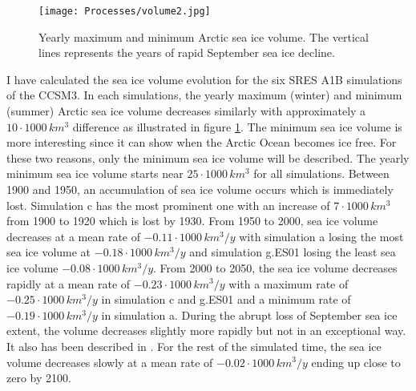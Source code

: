 \begin{figure}[t!]
\center
\noindent\texttt{[image: Processes/volume2.jpg]}
\caption{Yearly maximum and minimum Arctic sea ice volume. The vertical lines represents the years of rapid September sea ice decline.}
\label{icevol}
\end{figure}

I have calculated the sea ice volume evolution for the six SRES A1B simulations of the CCSM3. In each simulations, the yearly maximum (winter) and minimum (summer) Arctic sea ice volume decreases similarly with approximately a $10\cdot1000\,km^3$ difference as illustrated in figure \ref{icevol}. The minimum sea ice volume is more interesting since it can show when the Arctic Ocean becomes ice free. For these two reasons, only the minimum sea ice volume will be described. The yearly minimum sea ice volume starts near $25\cdot1000\,km^3$ for all simulations. Between 1900 and 1950, an accumulation of sea ice volume occurs which is immediately lost. Simulation c has the most prominent one with an increase of $7\cdot1000\,km^3$ from 1900 to 1920 which is lost by 1930. From 1950 to 2000, sea ice volume decreases at a mean rate of $-0.11\cdot1000\,km^3/y$ with simulation a losing the most sea ice volume at $-0.18\cdot1000\,km^3/y$ and simulation g.ES01 losing the least sea ice volume $-0.08\cdot1000\,km^3/y$. From 2000 to 2050, the sea ice volume decreases rapidly at a mean rate of $-0.23\cdot1000\,km^3/y$ with a maximum rate of $-0.25\cdot1000\,km^3/y$ in simulation c and g.ES01 and a minimum rate of $-0.19\cdot1000\,km^3/y$ in simulation a. During the abrupt loss of September sea ice extent, the volume decreases slightly more rapidly but not in an exceptional way. It also has been described in \citet{ISI:000242942100008}. For the rest of the simulated time, the sea ice volume decreases slowly at a mean rate of $-0.02\cdot1000\,km^3/y$ ending up close to zero by 2100.

